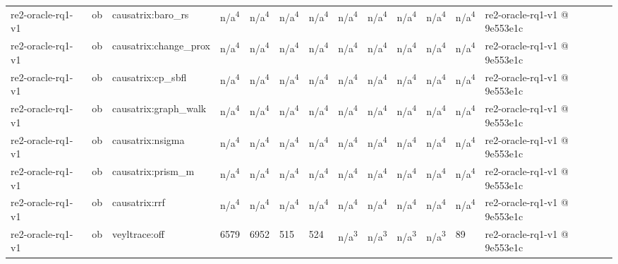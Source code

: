 \begin{table}[t]
\begin{tabular}{lllllllllllll}
re2-oracle-rq1-v1 & ob & causatrix:baro\_rs & n/a\textsuperscript{4} & n/a\textsuperscript{4} & n/a\textsuperscript{4} & n/a\textsuperscript{4} & n/a\textsuperscript{4} & n/a\textsuperscript{4} & n/a\textsuperscript{4} & n/a\textsuperscript{4} & n/a\textsuperscript{4} & re2-oracle-rq1-v1 @ 9e553e1c \\
re2-oracle-rq1-v1 & ob & causatrix:change\_prox & n/a\textsuperscript{4} & n/a\textsuperscript{4} & n/a\textsuperscript{4} & n/a\textsuperscript{4} & n/a\textsuperscript{4} & n/a\textsuperscript{4} & n/a\textsuperscript{4} & n/a\textsuperscript{4} & n/a\textsuperscript{4} & re2-oracle-rq1-v1 @ 9e553e1c \\
re2-oracle-rq1-v1 & ob & causatrix:cp\_sbfl & n/a\textsuperscript{4} & n/a\textsuperscript{4} & n/a\textsuperscript{4} & n/a\textsuperscript{4} & n/a\textsuperscript{4} & n/a\textsuperscript{4} & n/a\textsuperscript{4} & n/a\textsuperscript{4} & n/a\textsuperscript{4} & re2-oracle-rq1-v1 @ 9e553e1c \\
re2-oracle-rq1-v1 & ob & causatrix:graph\_walk & n/a\textsuperscript{4} & n/a\textsuperscript{4} & n/a\textsuperscript{4} & n/a\textsuperscript{4} & n/a\textsuperscript{4} & n/a\textsuperscript{4} & n/a\textsuperscript{4} & n/a\textsuperscript{4} & n/a\textsuperscript{4} & re2-oracle-rq1-v1 @ 9e553e1c \\
re2-oracle-rq1-v1 & ob & causatrix:nsigma & n/a\textsuperscript{4} & n/a\textsuperscript{4} & n/a\textsuperscript{4} & n/a\textsuperscript{4} & n/a\textsuperscript{4} & n/a\textsuperscript{4} & n/a\textsuperscript{4} & n/a\textsuperscript{4} & n/a\textsuperscript{4} & re2-oracle-rq1-v1 @ 9e553e1c \\
re2-oracle-rq1-v1 & ob & causatrix:prism\_m & n/a\textsuperscript{4} & n/a\textsuperscript{4} & n/a\textsuperscript{4} & n/a\textsuperscript{4} & n/a\textsuperscript{4} & n/a\textsuperscript{4} & n/a\textsuperscript{4} & n/a\textsuperscript{4} & n/a\textsuperscript{4} & re2-oracle-rq1-v1 @ 9e553e1c \\
re2-oracle-rq1-v1 & ob & causatrix:rrf & n/a\textsuperscript{4} & n/a\textsuperscript{4} & n/a\textsuperscript{4} & n/a\textsuperscript{4} & n/a\textsuperscript{4} & n/a\textsuperscript{4} & n/a\textsuperscript{4} & n/a\textsuperscript{4} & n/a\textsuperscript{4} & re2-oracle-rq1-v1 @ 9e553e1c \\
re2-oracle-rq1-v1 & ob & veyltrace:off & 6579 & 6952 & 515 & 524 & n/a\textsuperscript{3} & n/a\textsuperscript{3} & n/a\textsuperscript{3} & n/a\textsuperscript{3} & 89 & re2-oracle-rq1-v1 @ 9e553e1c \\

\end{tabular}
\end{table}
